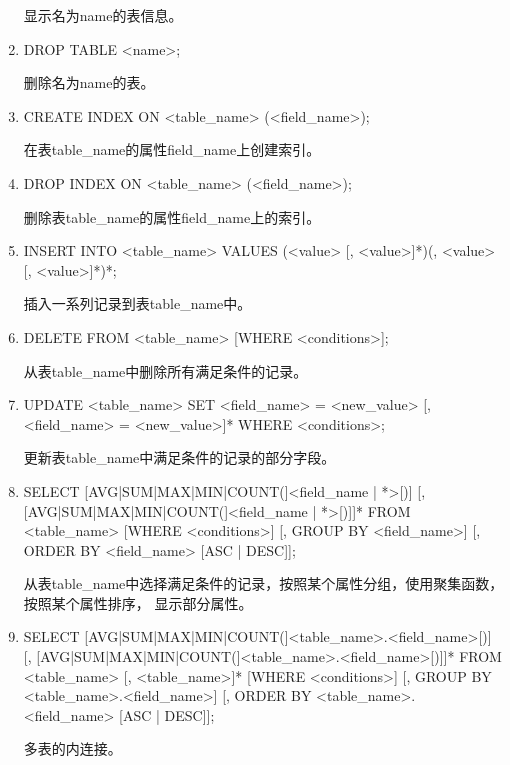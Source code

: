 \begin{enumerate}
    显示名为name的表信息。
    \item
    DROP TABLE <name>;

    删除名为name的表。
    \item
    CREATE INDEX ON <table\_name> (<field\_name>);
    
    在表table\_name的属性field\_name上创建索引。
    \item
    DROP INDEX ON <table\_name> (<field\_name>);

    删除表table\_name的属性field\_name上的索引。
    \item
    INSERT INTO <table\_name> VALUES (<value> [, <value>]*)(, <value> [, <value>]*)*;

    插入一系列记录到表table\_name中。
    \item
    DELETE FROM <table\_name> [WHERE <conditions>];

    从表table\_name中删除所有满足条件的记录。
    \item
    UPDATE <table\_name> SET <field\_name> = <new\_value> 
                     [, <field\_name> = <new\_value>]* 
        WHERE <conditions>;

    更新表table\_name中满足条件的记录的部分字段。
    \item
    SELECT [AVG|SUM|MAX|MIN|COUNT(]<field\_name | *>[)] 
           [, [AVG|SUM|MAX|MIN|COUNT(]<field\_name | *>[)]]* FROM <table\_name> 
                    [WHERE <conditions>]
                    [, GROUP BY <field\_name>]
                    [, ORDER BY <field\_name> [ASC | DESC]];

    从表table\_name中选择满足条件的记录，按照某个属性分组，使用聚集函数，%
    按照某个属性排序， 显示部分属性。
    \item
    SELECT [AVG|SUM|MAX|MIN|COUNT(]<table\_name>.<field\_name>[)] 
           [, [AVG|SUM|MAX|MIN|COUNT(]<table\_name>.<field\_name>[)]]*
        FROM <table\_name> [, <table\_name>]* [WHERE <conditions>]
                                            [, GROUP BY <table\_name>.<field\_name>]
                                            [, ORDER BY <table\_name>.<field\_name> [ASC | DESC]];
    
    多表的内连接。



    \end{enumerate}


